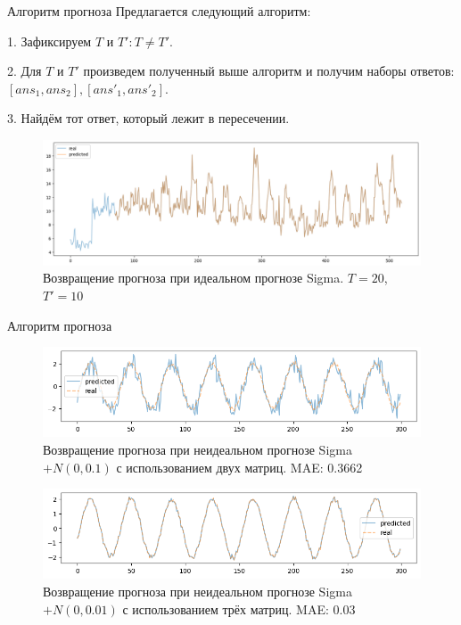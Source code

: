 \documentclass{beamer}
\begin{document}
\begin{frame}{Алгоритм прогноза}
	Предлагается следующий алгоритм:
	
	1. Зафиксируем $T$ и $T': T \neq T'$.
	
	2. Для $T$ и $T'$ произведем полученный выше алгоритм и получим наборы ответов: $[ans_1, ans_2], [ans'_1, ans'_2]$.
	
	3. Найдём тот ответ, который лежит в пересечении.
	\begin{figure}[H]
		\centering
		\includegraphics[width=\textwidth]{TwoTAlgo.png}
		\caption{Возвращение прогноза при идеальном прогнозе Sigma. $T=20$, $T'=10$}
		\label{fig:fig3}
	\end{figure}
\end{frame}
\begin{frame}{Алгоритм прогноза}
	\begin{figure}[H]
		\centering
		\includegraphics[width=\textwidth]{NonIdeal.png}
		\caption{Возвращение прогноза при неидеальном прогнозе Sigma $+ N(0, 0.1)$ с использованием двух матриц. MAE: 0.3662}
		\label{fig:fig4}
	\end{figure}
	\begin{figure}[H]
		\centering
		\includegraphics[width=\textwidth]{NonIdealBetter.png}
		\caption{Возвращение прогноза при неидеальном прогнозе Sigma $+ N(0, 0.01)$ с использованием трёх матриц. MAE: 0.03}
		\label{fig:fig5}
	\end{figure}
\end{frame}
\end{document}

